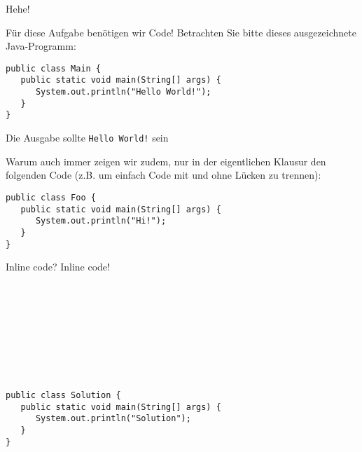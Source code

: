 \begin{task}[5]{Hehe!}
\label{ex:second}%

Für diese Aufgabe benötigen wir Code!
Betrachten Sie bitte dieses ausgezeichnete Java-Programm:

\begin{verbatim}
public class Main {
   public static void main(String[] args) {
      System.out.println("Hello World!");
   }
}
\end{verbatim}
\begin{examples}[Hier ein \ifnum\examplescount=1 Beispiel\else paar Beispiele\fi:]
   \item Die Ausgabe sollte \texttt{Hello World!} sein
\end{examples}

\ifexam
Warum auch immer zeigen wir zudem, nur in der eigentlichen Klausur den folgenden Code (z.B. um einfach Code mit und ohne Lücken zu trennen):

\begin{verbatim}
public class Foo {
   public static void main(String[] args) {
      System.out.println("Hi!");
   }
}
\end{verbatim}
\bigskip

\IndentGuides{9cm}

\IndentGuidesDistance{0.5cm}
\IndentGuides[4]{5cm}

\fi


Inline code? Inline code!

\\
\\
\\
\\
\\
\\
\\

\begin{solution}
\begin{verbatim}
public class Solution {
   public static void main(String[] args) {
      System.out.println("Solution");
   }
}
\end{verbatim}
\end{solution}


\end{task}
